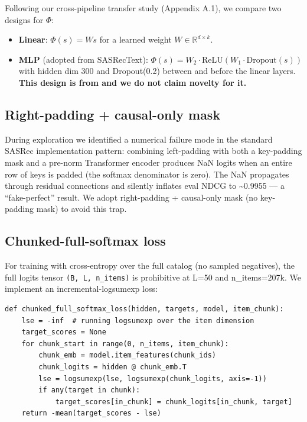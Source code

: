 Following our cross-pipeline transfer study (Appendix A.1), we compare two designs for $\Phi$:

\begin{itemize}
\tightlist
\item
  \textbf{Linear}: $\Phi(s) = W s$ for a learned weight $W \in \mathbb{R}^{d \times k}$.
\item
  \textbf{MLP} (adopted from \citet{hou2024blair} SASRecText): $\Phi(s) = W_2 \cdot \mathrm{ReLU}(W_1 \cdot \mathrm{Dropout}(s))$ with hidden dim 300 and Dropout(0.2) between and before the linear layers. \textbf{This design is from \citet{hou2024blair} and we do not claim novelty for it.}
\end{itemize}


\subsection{Right-padding + causal-only mask}\label{sec:3.4}

During exploration we identified a numerical failure mode in the standard SASRec implementation pattern: combining left-padding with both a key-padding mask and a pre-norm Transformer encoder produces NaN logits when an entire row of keys is padded (the softmax denominator is zero). The NaN propagates through residual connections and silently inflates eval NDCG to \textasciitilde0.9955 --- a ``fake-perfect'' result. We adopt right-padding + causal-only mask (no key-padding mask) to avoid this trap.


\subsection{Chunked-full-softmax loss}\label{sec:3.5}

For training with cross-entropy over the full catalog (no sampled negatives), the full logits tensor \texttt{(B,\ L,\ n\_items)} is prohibitive at L=50 and n\_items=207k. We implement an incremental-logsumexp loss:

\begin{verbatim}
def chunked_full_softmax_loss(hidden, targets, model, item_chunk):
    lse = -inf  # running logsumexp over the item dimension
    target_scores = None
    for chunk_start in range(0, n_items, item_chunk):
        chunk_emb = model.item_features(chunk_ids)
        chunk_logits = hidden @ chunk_emb.T
        lse = logsumexp(lse, logsumexp(chunk_logits, axis=-1))
        if any(target in chunk):
            target_scores[in_chunk] = chunk_logits[in_chunk, target]
    return -mean(target_scores - lse)
\end{verbatim}

